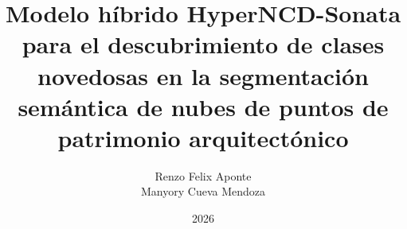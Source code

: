 \documentclass[a4paper,12pt,oneside]{tesisutec}
\begin{document}
\frontmatter


\title{Modelo híbrido HyperNCD-Sonata para el descubrimiento de clases
novedosas en la segmentación semántica de nubes de puntos de patrimonio
arquitectónico}

\author{Renzo Felix Aponte  \\
        Manyory Cueva Mendoza }

\date{2026}

\maketitle





\tableofcontents

\newpage

\listoftables

\newpage

\listoffigures


\mainmatter
\pagestyle{fancy}











\renewcommand{\bibname}{\hfill\Large\bf{REFERENCIAS BIBLIOGRÁFICAS}\hfill}









\end{document}
